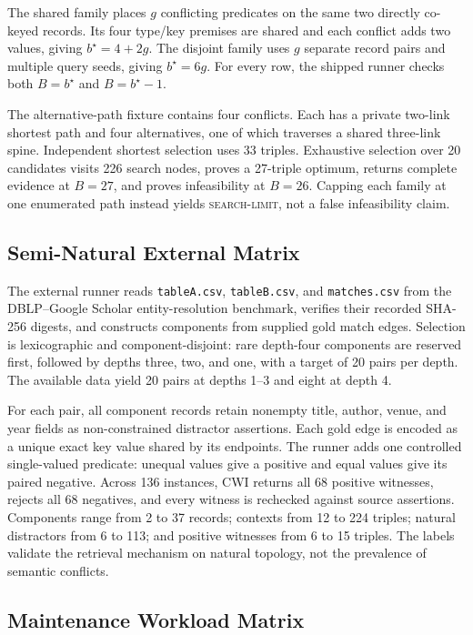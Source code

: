 \documentclass[letterpaper]{article}
\newcommand{\cwi}{\textsc{CWI}}
\begin{document}
The shared family places $g$ conflicting predicates on the same two directly
co-keyed records.  Its four type/key premises are shared and each conflict
adds two values, giving $b^\star=4+2g$.  The disjoint family uses $g$ separate
record pairs and multiple query seeds, giving $b^\star=6g$.  For every row,
the shipped runner checks both $B=b^\star$ and $B=b^\star-1$.

The alternative-path fixture contains four conflicts.  Each has a private
two-link shortest path and four alternatives, one of which traverses a shared
three-link spine.  Independent shortest selection uses 33 triples.  Exhaustive
selection over 20 candidates visits 226 search nodes, proves a 27-triple
optimum, returns complete evidence at $B=27$, and proves infeasibility at
$B=26$.  Capping each family at one enumerated path instead yields
\textsc{search-limit}, not a false infeasibility claim.

\subsection{Semi-Natural External Matrix}

The external runner reads \texttt{tableA.csv}, \texttt{tableB.csv}, and
\texttt{matches.csv} from the DBLP--Google Scholar entity-resolution
benchmark, verifies their recorded SHA-256 digests, and constructs components
from supplied gold match edges.  Selection is lexicographic and
component-disjoint: rare depth-four components are reserved first, followed by
depths three, two, and one, with a target of 20 pairs per depth.  The available
data yield 20 pairs at depths 1--3 and eight at depth 4.

For each pair, all component records retain nonempty title, author, venue, and
year fields as non-constrained distractor assertions.  Each gold edge is
encoded as a unique exact key value shared by its endpoints.  The runner adds
one controlled single-valued predicate: unequal values give a positive and
equal values give its paired negative.  Across 136 instances, \cwi{} returns
all 68 positive witnesses, rejects all 68 negatives, and every witness is
rechecked against source assertions.  Components range from 2 to 37 records;
contexts from 12 to 224 triples; natural distractors from 6 to 113; and
positive witnesses from 6 to 15 triples.  The labels validate the retrieval
mechanism on natural topology, not the prevalence of semantic conflicts.

\subsection{Maintenance Workload Matrix}
\end{document}
